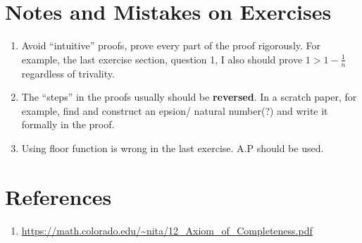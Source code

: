 \section{Notes and Mistakes on Exercises}
\begin{enumerate}
    \item Avoid ``intuitive'' proofs, prove every part of the proof rigorously. For example, the last exercise section, question 1, I also should prove $1 > 1 - \frac{1}{n}$ regardless of trivality.
    \item The ``steps'' in the proofs usually should be \textbf{reversed}. In a scratch paper, for example, find and construct an epsion/ natural number(?) and write it formally in the proof.
    \item Using floor function is wrong in the last exercise. A.P should be used.
\end{enumerate}
\section{References}
\begin{enumerate}
    \item \url{https://math.colorado.edu/~nita/12_Axiom_of_Completeness.pdf}
\end{enumerate}

